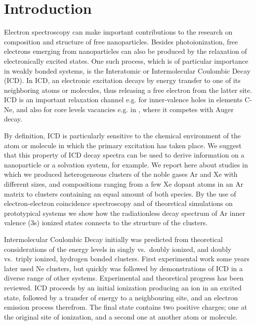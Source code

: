 \section{Introduction}
%
Electron spectroscopy can make important contributions to the 
research on composition and structure of free nanoparticles.\cite{
jpcc} Besides photoionization, free electrons emerging from 
nanoparticles can also be produced by the relaxation of 
electronically excited states. One such process, which is of 
particular importance in weakly bonded systems, is the 
Interatomic or Intermolecular Coulombic Decay (ICD).\cite{
cederbaum} In ICD, an electronic excitation decays by energy 
transfer to one of its neighboring atoms or molecules, thus 
releasing a free electron from the latter site. ICD is an 
important relaxation channel e.g. for inner-valence holes in 
elements C-Ne, and also for core levels vacancies e.g. in 
, where it competes with Auger decay.\cite{slavicek}

By definition, ICD is particularly sensitive to the chemical 
environment of the atom or molecule in which the primary 
excitation has taken place. We suggest that this property of ICD 
decay spectra can be used to derive information on a nanoparticle 
or a solvation system, for example. We report here about studies 
in which we produced heterogeneous clusters of the noble gases Ar 
and Xe with different sizes, and compositions ranging from a few 
Xe dopant atoms in an Ar matrix to clusters containing an equal 
amount of both species. By the use of electron-electron 
coincidence spectroscopy and of theoretical simulations on 
prototypical systems we show how the radiationless decay spectrum 
of Ar inner valence (3s) ionized states connects to the structure 
of the clusters.

Intermolecular Coulombic Decay initially was predicted from 
theoretical considerations of the energy levels in singly vs.\  
doubly ionized, and doubly vs.\ triply ionized, hydrogen bonded 
clusters.\cite{cederbaum} First experimental work some years 
later used Ne clusters,\cite{marburger,jahnkenedimer} but quickly 
was followed by demonstrations of ICD in a diverse range of other 
systems. Experimental and theoretical progress has been reviewed.
\cite{hergenhahn_review, averbukh_review, jahnke_review} ICD 
proceeds by an initial ionization producing an ion in an excited 
state, followed by a transfer of energy to a neighbouring site, 
and an electron emission process therefrom. The final state contains 
two positive charges; one at the original site of ionization, and a second
one at another atom or molecule. 

